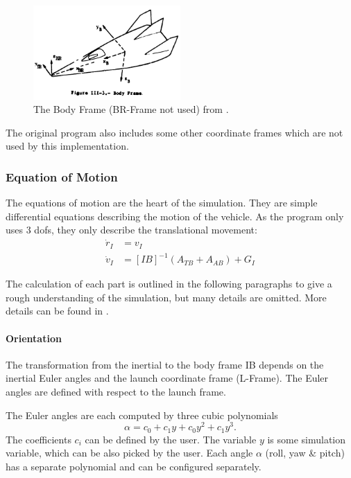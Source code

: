 \begin{figure}[!ht]
  \centering
  \includegraphics[width=0.5\textwidth]{images/body-frame.png}
  \caption{The Body Frame (BR-Frame not used) from \cite[Fig. III-3]{PostFormulation}.}
  \label{body-frame}
\end{figure}

The original program also includes some other coordinate frames which are not
used by this implementation.

\subsubsection{Equation of Motion}\label{equation-of-motion}

The equations of motion are the heart of the simulation. They are simple
differential equations describing the motion of the vehicle. As the program
only uses 3 \glspl{dof}, they only describe the translational movement:
\[
  \begin{array}{ll}
    \dot r_I & = v_I                              \\
    \dot v_I & = [IB]^{-1}(A_{TB} + A_{AB}) + G_I
  \end{array}
\]

The calculation of each part is outlined in the following paragraphs to give a
rough understanding of the simulation, but many details are omitted. More
details can be found in \cite[Sec. VI-4]{PostFormulation}.

\paragraph{Orientation}

The transformation from the inertial to the body frame \gls{IB} depends on the inertial Euler angles and the launch coordinate frame
(L-Frame). The Euler angles are defined with respect to the launch frame.

The Euler angles are each computed by three cubic polynomials \[
  \alpha = c_0 + c_1y + c_0y^2 + c_1y^3.
\] The coefficients \(c_i\) can be defined by the user. The variable
\(y\) is some simulation variable, which can be also picked by the user.
Each angle \(\alpha\) (roll, yaw \& pitch) has a separate polynomial and can be
configured separately.


